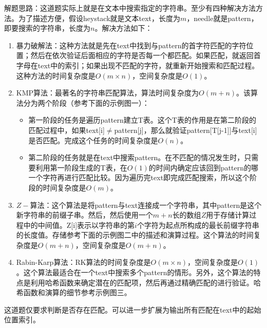 \documentclass[a4paper,10pt]{article}
\begin{document}
\begin{CJK*}{UTF8}{gbsn}
\noindent 解题思路：这道题实际上就是在文本中搜索指定的字符串。至少有四种解决方法方法。为了描述方便，假设heystack就是文本text，长度为$m$，needle就是pattern，即要搜索的字符串，长度为$n$。解决方法如下：
\begin{enumerate}
    \item 暴力破解法：这种方法就是先在text中找到与pattern的首字符匹配的字符位置；然后在依次验证后面相应的字符是否每一个都匹配。如果匹配，就返回首字母在text中的索引；如果出现不匹配的字符，就重新开始搜索和匹配过程。这种方法的时间复杂度是$O(m \times n)$，空间复杂度是$O(1)$。
    
    \item KMP算法：最著名的字符串匹配算法，算法时间复杂度为$O(m+n)$。该算法分为两个阶段（参考下面的示例图一）：
        \begin{itemize}
            \item 第一阶段的任务是遍历pattern建立T表。这个T表的作用是在第二阶段的匹配过程中，如果text[i]$\neq$pattern[j]，那么就验证pattern[T[j-1]]与text[i]是否匹配。完成这个任务的时间复杂度是$O(n)$。
            \item 第二阶段的任务就是在text中搜索pattern。在不匹配的情况发生时，只需要利用第一阶段生成的T表，在$O(1)$的时间内确定应该回到pattern的哪一个字符再进行匹配比较。因为遍历完text即完成匹配搜索，所以这个阶段的时间复杂度是$O(m)$。
        \end{itemize}
    
    \item $Z-$算法：这个算法是将pattern与text连接成一个字符串，其中pattern是这个新字符串的前缀子串。然后，然后使用一个$m+n$长的数组$Z$用于存储计算过程中的中间值。Z[i]表示以字符串的第$i$个字符为起点所构成的最长前缀字符串的长度值。存储参考下面的示例图二中的描述和演算过程。这个算法的时间复杂度是$O(m+n)$，空间复杂度是$O(m+n)$。
    
    \item Rabin-Karp算法：RK算法的时间复杂度是$O(m \times n)$，空间复杂度是$O(1)$。这个算法最适合在一个text中搜索多个pattern的情形。另外，这个算法的特点是利用哈希函数来确定潜在的匹配项，然后再通过精确匹配的进行验证。哈希函数和演算的细节参考示例图三。

\end{enumerate}

\noindent 这道题仅要求判断是否存在匹配。可以进一步扩展为输出所有匹配在text中的起始位置索引。
\end{CJK*}
\end{document}
